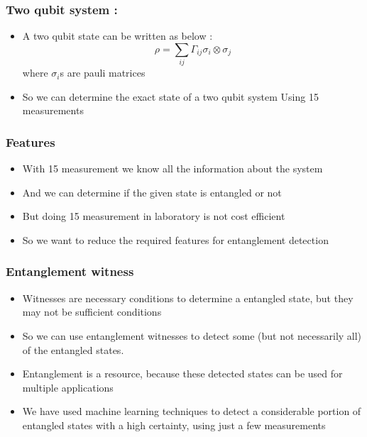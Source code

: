 \documentclass[11pt]{beamer}
\begin{document}
\begin{frame}
\frametitle{Two qubit system :}

\begin{itemize}
 \item  A two qubit state can be written as below : 
  $$ \rho = \sum_{ij} \Gamma_{ij} \sigma_i \otimes \sigma_j$$
  where $\sigma_i$s are pauli matrices
 \item  So we can determine the exact state of a two qubit system Using 15 measurements
\end{itemize}

\end{frame}

\begin{frame}
\frametitle{Features}

\begin{itemize}
 \item  With 15 measurement we know all the information about the system
 \item  And we can determine if the given state is entangled or not
 \item  But doing 15 measurement in laboratory is not cost efficient
 \item  So we want to reduce the required features for entanglement detection
\end{itemize}

\end{frame}

\begin{frame}
\frametitle{Entanglement witness}

\begin{itemize}
 \item Witnesses are necessary conditions to determine a entangled state, but they may not be sufficient conditions
 \item So we can use entanglement witnesses to detect some (but not necessarily all) of the entangled states.
 \item  Entanglement is a resource, because these detected states can be used for multiple applications 
 \item We have used machine learning techniques to detect a considerable portion of entangled states with a high certainty, using just a few measurements
\end{itemize}

\end{frame}
\end{document}
